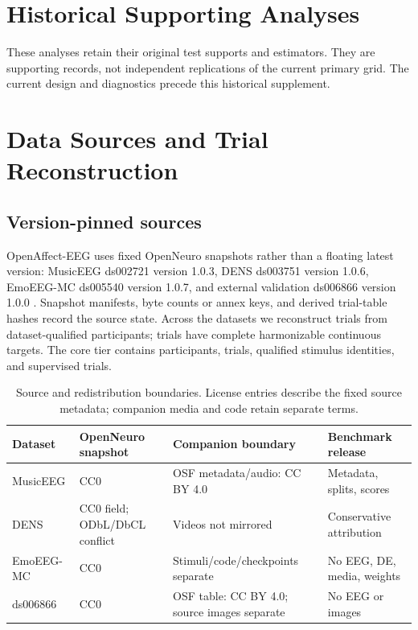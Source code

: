 \section*{Historical Supporting Analyses}
These analyses retain their original test supports and estimators. They are supporting records, not independent replications of the current primary grid. The current design and diagnostics precede this historical supplement.

\section{Data Sources and Trial Reconstruction}
\label{app:data}

\subsection{Version-pinned sources}

OpenAffect-EEG uses fixed OpenNeuro snapshots rather than a floating latest
version: MusicEEG ds002721 version 1.0.3, DENS ds003751 version 1.0.6,
EmoEEG-MC ds005540 version 1.0.7, and external validation ds006866 version
1.0.0
\citep{openneuro_ds002721,openneuro_ds003751,openneuro_ds005540,openneuro_ds006866}.
Snapshot manifests, byte counts or annex keys, and derived trial-table hashes
record the source state. Across the  datasets we reconstruct
 trials from  dataset-qualified participants;
 trials have complete harmonizable continuous targets. The core
tier contains  participants,  trials,
 qualified stimulus identities, and  supervised
trials.

\begin{table}[t]
  \caption{Source and redistribution boundaries. License entries describe the
  fixed source metadata; companion media and code retain separate terms.}
  \label{tab:licenses}
  \centering
  \small
  \setlength{\tabcolsep}{4pt}
  \begin{tabularx}{\linewidth}{@{}lXXX@{}}
    \toprule
    Dataset & OpenNeuro snapshot & Companion boundary & Benchmark release \\
    \midrule
    MusicEEG & CC0 & OSF metadata/audio: CC BY 4.0 & Metadata, splits, scores \\
    DENS & CC0 field; ODbL/DbCL conflict & Videos not mirrored & Conservative attribution \\
    EmoEEG-MC & CC0 & Stimuli/code/checkpoints separate & No EEG, DE, media, weights \\
    ds006866 & CC0 & OSF table: CC BY 4.0; source images separate & No EEG or images \\
    \bottomrule
  \end{tabularx}
\end{table}

